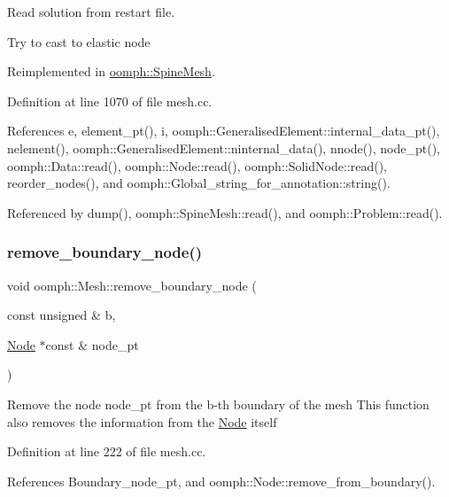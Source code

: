 Read solution from restart file. 

Try to cast to elastic node 

Reimplemented in \hyperlink{classoomph_1_1SpineMesh_a281b1de21b0957de28fe78a93c80a215}{oomph\+::\+Spine\+Mesh}.



Definition at line 1070 of file mesh.\+cc.



References e, element\+\_\+pt(), i, oomph\+::\+Generalised\+Element\+::internal\+\_\+data\+\_\+pt(), nelement(), oomph\+::\+Generalised\+Element\+::ninternal\+\_\+data(), nnode(), node\+\_\+pt(), oomph\+::\+Data\+::read(), oomph\+::\+Node\+::read(), oomph\+::\+Solid\+Node\+::read(), reorder\+\_\+nodes(), and oomph\+::\+Global\+\_\+string\+\_\+for\+\_\+annotation\+::string().



Referenced by dump(), oomph\+::\+Spine\+Mesh\+::read(), and oomph\+::\+Problem\+::read().

\mbox{\label{classoomph_1_1Mesh_a1690e5351ff05b5e47db184f64b1edc4}} 
\subsubsection{\texorpdfstring{remove\+\_\+boundary\+\_\+node()}{remove\_boundary\_node()}}
{\footnotesize\ttfamily void oomph\+::\+Mesh\+::remove\+\_\+boundary\+\_\+node (\begin{DoxyParamCaption}\item[{const unsigned \&}]{b,  }\item[{\hyperlink{classoomph_1_1Node}{Node} $\ast$const \&}]{node\+\_\+pt }\end{DoxyParamCaption})}

Remove the node node\+\_\+pt from the b-\/th boundary of the mesh This function also removes the information from the \hyperlink{classoomph_1_1Node}{Node} itself 

Definition at line 222 of file mesh.\+cc.



References Boundary\+\_\+node\+\_\+pt, and oomph\+::\+Node\+::remove\+\_\+from\+\_\+boundary().



